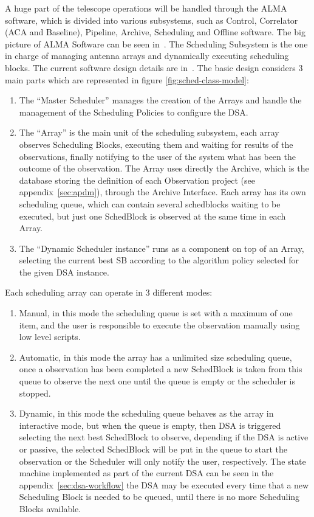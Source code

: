 A huge part of the telescope operations will be handled through the ALMA software, which is divided into various subsystems, such as Control, Correlator (ACA and Baseline), Pipeline, Archive, Scheduling and Offline software. The big picture of ALMA Software can be seen in~\cite{schwarz04}.
The Scheduling Subsystem is the one in charge of managing antenna arrays and dynamically executing scheduling blocks. The current software design details are in~\cite{clarke12}. The basic design considers 3 main parts which are represented in figure \ref{fig:sched-class-model}: 
\begin{enumerate}
\item The ``Master Scheduler'' manages the creation of the Arrays and handle the management of the Scheduling Policies to configure the DSA.

\item  The ``Array'' is the main unit of the scheduling subsystem, each array observes Scheduling Blocks, executing them and waiting for results of the observations, finally notifying to the user of the system what has been the outcome of the observation. The Array uses directly the Archive, which is the database storing the definition of each Observation project (see appendix~\ref{sec:apdm}), through the Archive Interface. Each array has its own scheduling queue, which can contain several schedblocks waiting to be executed, but just one SchedBlock is observed at the same time in each Array.

\item The ``Dynamic Scheduler instance'' runs as a component on top of an Array, selecting the current best SB according to the algorithm policy selected for the given DSA instance.
\end{enumerate}

Each scheduling array can operate in 3 different modes:
\begin{enumerate} 
\item Manual, in this mode the scheduling queue is set with a maximum of one item, and the user is responsible to execute the observation manually using low level scripts. 
\item Automatic, in this mode the array has a unlimited size scheduling queue, once a observation has been completed a new SchedBlock is taken from this queue to observe the next one until the queue is empty or the scheduler is stopped.
\item Dynamic, in this mode the scheduling queue behaves as the array in interactive mode, but when the queue is empty, then DSA is triggered selecting the next best SchedBlock to observe, depending if the DSA is active or passive, the selected SchedBlock will be put in the queue to start the observation or the Scheduler will only notify the user, respectively. The state machine implemented as part of the current DSA can be seen in the appendix~\ref{sec:dsa-workflow} the DSA may be executed every time that a new Scheduling Block is needed to be queued, until there is no more Scheduling Blocks available.
\end{enumerate}


